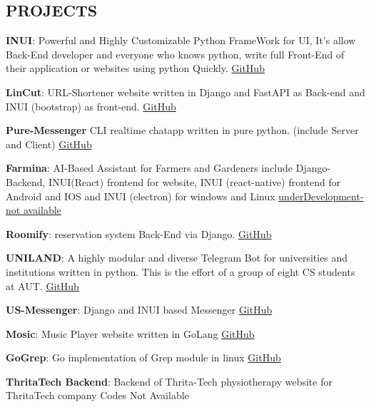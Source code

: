 \documentclass[margin]{res}
\begin{document}
\begin{resume}
\section{PROJECTS}
\par
\textbf{INUI}: 
Powerful and Highly Customizable Python FrameWork for UI, It's allow Back-End developer and everyone who knows python, write full Front-End of their application or websites using python Quickly. \hfill \href{https://github.com/MohammadrezaAmani/INUI}{GitHub}

\par
\textbf{LinCut}:
URL-Shortener website written in Django and FastAPI as Back-end and INUI (bootstrap) as front-end. \hfill \href{https://github.com/MohammadrezaAmani/LinCut}{GitHub}
\par
\textbf{Pure-Messenger} 
CLI realtime chatapp written in pure python. (include Server and Client) \hfill \href{https://github.com/MohammadrezaAmani/Python-Websocket-Chatapp}{GitHub}


\par
\textbf{Farmina}: 
AI-Based Assistant for Farmers and Gardeners include Django-Backend, INUI(React) frontend for website, INUI (react-native) frontend for Android and IOS and INUI (electron) for windows and Linux \hfill \href{https://github.com/MohammadrezaAmani/Farmina}{underDevelopment-not available}

\par
\textbf{Roomify}: 
reservation system Back-End via Django. \hfill \href{https://github.com/MohammadrezaAmani/Roomify}{GitHub}

\par
\textbf{UNILAND}: 
A highly modular and diverse Telegram Bot for universities and institutions written in python. This is the effort of a group of eight CS students at AUT. \hfill \href{https://github.com/MohammadrezaAmani/UniLand}{GitHub}
\par
\textbf{US-Messenger}: 
Django and INUI based Messenger \hfill \href{https://github.com/MohammadrezaAmani/US-Messenger}{GitHub}
\par
\textbf{Mosic}: 
Music Player website written in GoLang \hfill \href{https://github.com/MohammadrezaAmani/Mosic}{GitHub}
\par
\textbf{GoGrep}: 
Go implementation of Grep module in linux \hfill \href{https://github.com/MohammadrezaAmani/GoGrep}{GitHub}
\par
\textbf{ThritaTech Backend}: 
Backend of Thrita-Tech physiotherapy website for ThritaTech company \hfill Codes Not Available


\end{resume}
\end{document}

